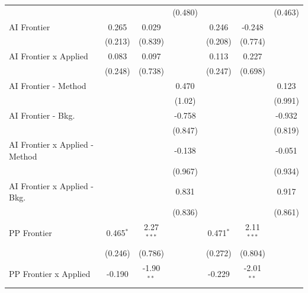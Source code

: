 \begin{tabular}{lcccccc}
                                  &                &               & (0.480)       &                &               & (0.463)\\   
   AI Frontier                    & 0.265          & 0.029         &               & 0.246          & -0.248        &   \\   
                                  & (0.213)        & (0.839)       &               & (0.208)        & (0.774)       &   \\   
   AI Frontier x Applied          & 0.083          & 0.097         &               & 0.113          & 0.227         &   \\   
                                  & (0.248)        & (0.738)       &               & (0.247)        & (0.698)       &   \\   
   AI Frontier - Method           &                &               & 0.470         &                &               & 0.123\\   
                                  &                &               & (1.02)        &                &               & (0.991)\\   
   AI Frontier - Bkg.             &                &               & -0.758        &                &               & -0.932\\   
                                  &                &               & (0.847)       &                &               & (0.819)\\   
   AI Frontier x Applied - Method &                &               & -0.138        &                &               & -0.051\\   
                                  &                &               & (0.967)       &                &               & (0.934)\\   
   AI Frontier x Applied - Bkg.   &                &               & 0.831         &                &               & 0.917\\   
                                  &                &               & (0.836)       &                &               & (0.861)\\   
   PP Frontier                    & 0.465$^{*}$    & 2.27$^{***}$  &               & 0.471$^{*}$    & 2.11$^{***}$  &   \\   
                                  & (0.246)        & (0.786)       &               & (0.272)        & (0.804)       &   \\   
   PP Frontier x Applied          & -0.190         & -1.90$^{**}$  &               & -0.229         & -2.01$^{**}$  &   \\   

\end{tabular}
